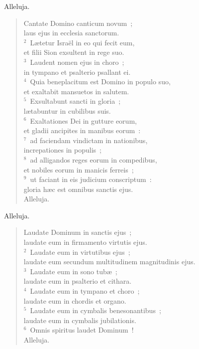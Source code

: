\bchapter
\lettrine[lines=3,image=true,loversize=0.05,lraise=-0.03]{A}{}lleluja. \begin{flushleft}\begin{verse}\vspace{6pt}Cantate Domino canticum novum~;\\ laus ejus in ecclesia sanctorum.\\
${}^{2}$~L\ae tetur Isra\"el in eo qui fecit eum,\\ et filii Sion exsultent in rege suo.\\
${}^{3}$~Laudent nomen ejus in choro~;\\ in tympano et psalterio psallant ei.\\
${}^{4}$~Quia beneplacitum est Domino in populo suo,\\ et exaltabit mansuetos in salutem.\\
${}^{5}$~Exsultabunt sancti in gloria~;\\ l\ae tabuntur in cubilibus suis.\\
${}^{6}$~Exaltationes Dei in gutture eorum,\\ et gladii ancipites in manibus eorum~:\\
${}^{7}$~ad faciendam vindictam in nationibus,\\ increpationes in populis~;\\
${}^{8}$~ad alligandos reges eorum in compedibus,\\ et nobiles eorum in manicis ferreis~;\\
${}^{9}$~ut faciant in eis judicium conscriptum~:\\ gloria h\ae c est omnibus sanctis ejus.\\ Alleluja.\end{verse}\end{flushleft}



\bchapter
\lettrine[lines=3,image=true,loversize=0.05,lraise=-0.03]{A}{}lleluja. \begin{flushleft}\begin{verse}\vspace{6pt}Laudate Dominum in sanctis ejus~;\\ laudate eum in firmamento virtutis ejus.\\
${}^{2}$~Laudate eum in virtutibus ejus~;\\ laudate eum secundum multitudinem magnitudinis ejus.\\
${}^{3}$~Laudate eum in sono tub\ae~;\\ laudate eum in psalterio et cithara.\\
${}^{4}$~Laudate eum in tympano et choro~;\\ laudate eum in chordis et organo.\\
${}^{5}$~Laudate eum in cymbalis benesonantibus~;\\ laudate eum in cymbalis jubilationis.\\
${}^{6}$~Omnis spiritus laudet Dominum~!\\ Alleluja.\end{verse}\end{flushleft}


